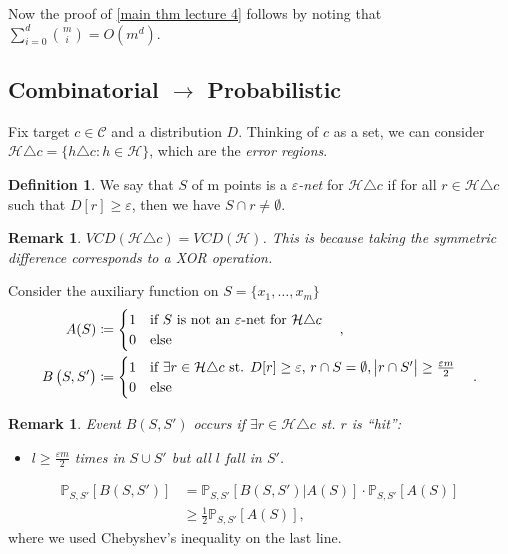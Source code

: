 \documentclass[12pt, letterpaper]{article}
\numberwithin{equation}{section} %
\newcommand{\mb}{\mathbb}
\newcommand{\mc}{\mathcal}
\newcommand{\ve}{\varepsilon}
\newtheorem{remark}[theorem]{Remark}
\theoremstyle{definition}
\newtheorem{definition}[theorem]{Definition}
\theoremstyle{remark}
\begin{document}
Now the proof of \cref{main thm lecture 4} follows by noting that $\sum\limits_{i=0}^d\binom{m}{i} = O(m^d)$.

\subsection{Combinatorial $\rightarrow$ Probabilistic}
Fix target $c\in\mc C$ and a distribution $D$. Thinking of $c$ as a set, we can consider $\mc H\triangle c = \lbrace h\triangle c : h\in\mc H \rbrace$, which are the \emph{error regions}.
\begin{definition}
 We say that $S$ of m points is a \emph{$\ve$-net} for $\mc H\triangle c$ if for all $r\in\mc H\triangle c$ such that $D[r]\geq \ve$, then we have $S\cap r \ne \emptyset$.
\end{definition}
\begin{remark}
$VCD(\mc H\triangle c) = VCD(\mc H)$. This is because taking the symmetric difference corresponds to a XOR operation.
\end{remark}
Consider the auxiliary function on $S = \lbrace x_1,\ldots,x_m\rbrace$
\begin{align}
    A(S)&\coloneqq
    \begin{cases}
    1\quad\textrm{if $S$ is not an $\ve$-net for $\mc H\triangle c$}\\
    0\quad\textrm{else}
    \end{cases},\\
    B\left(S, S'\right)&\coloneqq
    \begin{cases}
    1\quad\textrm{if $\exists r \in \mc H\triangle c$ st. $D[r]\geq\ve$, $r\cap S=\emptyset$, $\abs{r\cap S'}\geq \frac{\ve m}2$}\\
    0\quad\textrm{else}
    \end{cases}.
\end{align}
\begin{remark}
    Event $B\left(S, S'\right)$ occurs if $\exists r \in \mc H\triangle c$ st. $r$ is ``hit'':
    \begin{itemize}
    \item $l \geq \frac{\ve m}2$ times in $S\cup S'$ but \emph{all} $l$ fall in $S'$.
    \end{itemize}
\end{remark}
\begin{align}
    \mb P_{S, S'}[B(S, S')] &= \mb P_{S, S'}[ B(S, S') \left|\right. A(S)] \cdot  \mb P_{S, S'}[A(S)]\\
    &\geq \frac12  \mb P_{S, S'}[A(S)],
\end{align}
where we used Chebyshev's inequality on the last line.
\end{document}
